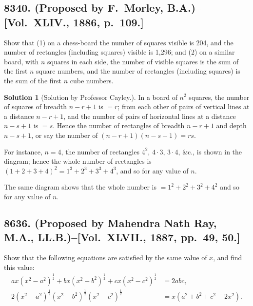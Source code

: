 \documentclass[11pt,a4paper]{article}
\theoremstyle{definition}
\newtheorem*{solution}{Solution}
\begin{document}
\subsection*{8340. (Proposed by F.~Morley, B.A.)\---[Vol.~XLIV., 1886, p.~109.]}

Show that (1) on a chess-board the number of squares visible is 204, and the number of rectangles (including squares) visible is 1,296; and (2) on a similar board, with $n$ squares in each side, the number of visible squares is the sum of the first $n$ square numbers, and the number of rectangles (including squares) is the sum of the first $n$ cube numbers.

\begin{solution}[Solution by Professor Cayley.]
In a board of $n^2$ squares, the number of squares of breadth $n-r+1$ is $=r$; from each other of pairs of vertical lines at a distance $n-r+1$, and the number of pairs of horizontal lines at a distance $n-s+1$ is $=s$. Hence the number of rectangles of breadth $n-r+1$ and depth $n-s+1$, or say the number of $(n-r+1)(n-s+1)=rs$.

For instance, $n=4$, the number of rectangles $4^2$, $4\cdot3$, $3\cdot4$, \&c., is shown in the diagram; hence the whole number of rectangles is $(1+2+3+4)^2 = 1^3+2^3+3^3+4^3$, and so for any value of $n$.

The same diagram shows that the whole number is $=1^2+2^2+3^2+4^2$ and so for any value of $n$.
\end{solution}

\subsection*{8636. (Proposed by Mahendra Nath Ray, M.A., LL.B.)\---[Vol.~XLVII., 1887, pp.~49, 50.]}

Show that the following equations are satisfied by the same value of $x$, and find this value:
\[
\begin{aligned}
ax(x^2-a^2)^{\frac{1}{2}} + bx(x^2-b^2)^{\frac{1}{2}} + cx(x^2-c^2)^{\frac{1}{2}} &= 2abc, \\
2(x^2-a^2)^{\frac{1}{2}}(x^2-b^2)^{\frac{1}{2}}(x^2-c^2)^{\frac{1}{2}} &= x(a^2+b^2+c^2-2x^2).
\end{aligned}
\]
\end{document}
